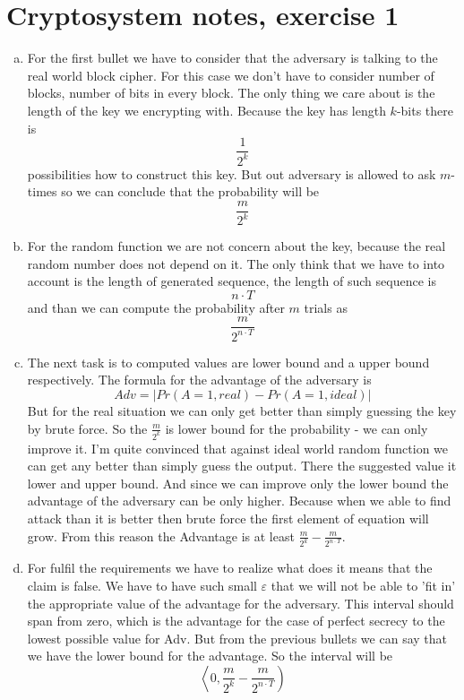 \documentclass[a4paper,10pt]{article}
\begin{document}
\section*{Cryptosystem notes, exercise 1}
\begin{enumerate}[a)]
\item For the first bullet we have to consider that the adversary is talking to the real world block cipher. For this case we don't have to consider number of blocks, number of bits in every block. The only thing we care about is the length of the key we encrypting with. Because the key has length $k$-bits there is 
$$
\frac{1}{2^k}
$$
possibilities how to construct this key. But out adversary is allowed to ask $m$-times so we can conclude that the probability will be
$$
\frac{m}{2^k}
$$

\item
For the random function we are not concern about the key, because the real random number does not depend on it. The only think that we have to into account is the length of generated sequence, the length of such sequence is
$$
n\cdot T
$$
and than we can compute the probability after $m$ trials as
$$
\frac{m}{2^{n\cdot T}}
$$

\item The next task is to computed values are lower bound and a upper bound respectively.
The formula for the advantage  of the adversary is
$$
Adv = \vert Pr(A=1,real) - Pr(A=1,ideal) \vert
$$
But for the real situation we can only get better than simply guessing the key by brute force. So the $\frac{m}{2^k}$ is lower bound for the probability - we can only improve it. I'm quite convinced that against ideal world random function we can get any better than simply guess the output. There the suggested value it lower and upper bound. And since we can improve only the lower bound the advantage of the adversary can be only higher. Because when we able to find attack than it is better then brute force the first element of equation will grow. From this reason the Advantage is at least $\frac{m}{2^k} - \frac{m}{2^{n\cdot T}}$.

\item 
For fulfil the requirements we have to realize what does it means that the claim is false. We have to have such small $\varepsilon$ that we will not be able to 'fit in' the appropriate value of the advantage for the adversary. This interval should span from zero, which is the advantage for the case of perfect secrecy to the lowest possible value for Adv. But from the previous bullets we can say that we have the lower bound for the advantage. So the interval will be
$$
\left\langle 0, \frac{m}{2^k} - \frac{m}{2^{n\cdot T}}\right)
$$
\end{enumerate}
\end{document}
